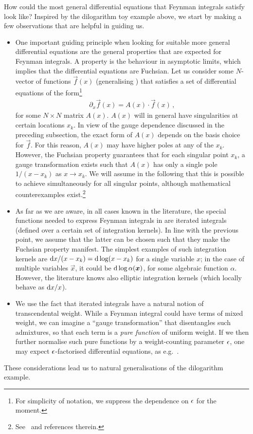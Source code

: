 How could the most general differential equations that Feynman integrals satisfy look like? Inspired by the dilogarithm toy example above, 
we start by making a few observations that are helpful in guiding us.
\begin{itemize}
\item One important guiding principle when looking for suitable more general differential equations 
are the general properties that are expected for Feynman integrals. 
A property is the behaviour in asymptotic limits, which implies that the differential equations are Fuchsian. 
Let us consider some $N$-vector of functions $\vec{f}(x)$ (generalising ) that satisfies a set of differential equations of the form\footnote{For simplicity of notation, we suppress the dependence on $\epsilon$ for the moment.}
\begin{align}
\partial_x \vec{f}(x) = A(x) \cdot \vec{f}(x) \,,
\end{align}
for some $N\times N$ matrix $A(x)$.
$A(x)$ will in general have singularities at certain locations $x_k$.
In view of the gauge dependence discussed in the preceding subsection, the exact form of $A(x)$ depends on the basis choice for $\vec{f}$.
For this reason, $A(x)$ may have higher poles at any of the $x_k$. 
However, the Fuchsian property guarantees that for each singular point $x_k$, a gauge transformation exists such that $A(x)$ has only a single pole $1/(x-x_{k})$ as $x \to x_{k}$. 
We will assume in the following that this is possible to achieve simultaneously for all singular points, although mathematical counterexamples exist.\footnote{See~\cite{ch4Henn:2014qga,ch4Lee:2014ioa} and references therein.}
\smallskip
\item As far as we are aware, in all cases known in the literature, the special functions needed to express Feynman integrals in are iterated integrals (defined over a certain set of integration kernels). In line with the previous point, we assume that the latter can be chosen such that they make the Fuchsian property manifest.
The simplest examples of such integration kernels are $\mathrm{d} x/(x-x_k) = \mathrm{d} \log(x-x_k)$ for a single variable $x$; in the case of multiple variables $\vec{x}$, it could be $\d\log \alpha(\vec{x})$, for some algebraic function $\alpha$. However, the literature knows also elliptic integration kernels (which locally behave as $\mathrm{d} x/x$).
\smallskip
\item We use the fact that iterated integrals have a natural notion of transcendental weight. While a Feynman integral could have terms of mixed weight, we can imagine a ``gauge transformation'' that disentangles such admixtures, so that each term is a {\it pure function} of uniform weight. If we then further normalise such pure functions by a weight-counting parameter $\epsilon$, one may expect $\epsilon$-factorised differential equations, as e.g.~.
\end{itemize}
These considerations lead us to natural generalisations of the dilogarithm example.

